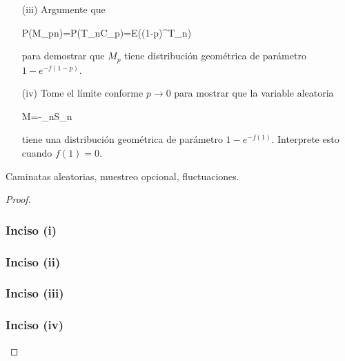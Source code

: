 \begin{problema}
\begin{enumerate}
		\item[(iii)] 
					Argumente que
					\begin{esn}
						P(M_p\geq n)=P(T_n\leq C_p)=E((1-p)^{T_n})
					\end{esn}
					para demostrar que $M_p$ tiene distribuci\'on geom\'etrica de par\'ametro $1-e^{-f(1-p)}$.
					
		\item[(iv)] 
					Tome el límite conforme \(p\to 0\) para mostrar que la variable aleatoria 
					\begin{esn}
						M=-\min_{n\geq 0}S_n
					\end{esn}
					tiene una distribuci\'on geom\'etrica de par\'ametro $1-e^{-f(1)}$. Interprete esto cuando $f(1)=0$.
	\end{enumerate}

		 Caminatas aleatorias, muestreo opcional, fluctuaciones.
\end{problema}


\begin{proof}
	\subsubsection{Inciso (i)} 
	
	\newpage
	
	\subsubsection{Inciso (ii)} 
	
	\newpage
		
	\subsubsection{Inciso (iii)}
	
	\newpage
	
	\subsubsection{Inciso (iv)} 
	
\end{proof}